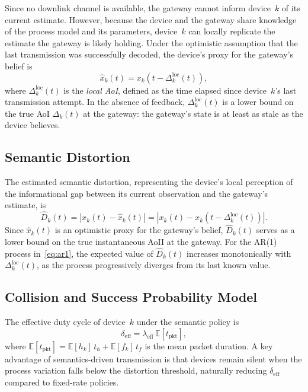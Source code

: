 \documentclass[lettersize,journal]{IEEEtran}
\begin{document}
Since no downlink channel is available, the gateway cannot inform device~$k$ of its current estimate. However, because the device and the gateway share knowledge of the process model and its parameters, device~$k$ can locally replicate the estimate the gateway is likely holding. Under the optimistic assumption that the last transmission was successfully decoded, the device's proxy for the gateway's belief is
\begin{equation}
  \hat{x}_k(t) = x_k\!\left(t - \Delta_k^{\mathrm{loc}}(t)\right),
  \label{eq:gateway_est}
\end{equation}
where $\Delta_k^{\mathrm{loc}}(t)$ is the \emph{local \ac{AoI}}, defined as the time elapsed since device~$k$'s last transmission attempt. In the absence of feedback, $\Delta_k^{\mathrm{loc}}(t)$ is a lower bound on the true \ac{AoI} $\Delta_k(t)$ at the gateway: the gateway's state is at least as stale as the device believes.

\subsection{Semantic Distortion}
\label{subsec:distortion}

The estimated semantic distortion, representing the device's local perception of the informational gap between its current observation and the gateway's estimate, is
\begin{equation}
  \hat{D}_k(t) = \left|x_k(t) - \hat{x}_k(t)\right|
           = \left|x_k(t) - x_k\!\left(t - \Delta_k^{\mathrm{loc}}(t)\right)\right|.
  \label{eq:distortion}
\end{equation}
Since $\hat{x}_k(t)$ is an optimistic proxy for the gateway's belief, $\hat{D}_k(t)$ serves as a lower bound on the true instantaneous \ac{AoII} at the gateway. For the AR(1) process in~\eqref{eq:ar1}, the expected value of $\hat{D}_k(t)$ increases monotonically with $\Delta_k^{\mathrm{loc}}(t)$, as the process progressively diverges from its last known value.

\subsection{Collision and Success Probability Model}
\label{subsec:collision}

The effective duty cycle of device~$k$ under the semantic policy is
\begin{equation}
  \delta_{\mathrm{eff}} = \lambda_{\mathrm{eff}}\,
    \mathbb{E}\!\left[t_{\mathrm{pkt}}\right],
  \label{eq:duty_cycle}
\end{equation}
where $\mathbb{E}[t_{\mathrm{pkt}}] = \mathbb{E}[h_k]\,t_h + \mathbb{E}[f_k]\,t_f$ is the mean packet duration. A key advantage of semantics-driven transmission is that devices remain silent when the process variation falls below the distortion threshold, naturally reducing $\delta_{\mathrm{eff}}$ compared to fixed-rate policies.
\end{document}
